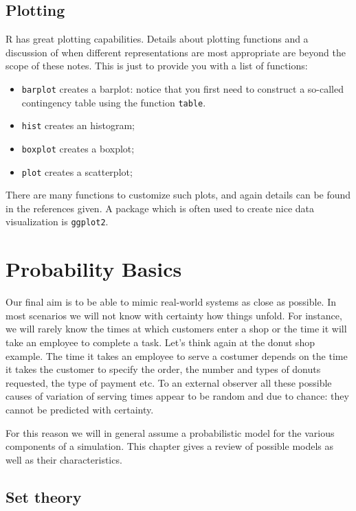 \documentclass[
]{book}
\theoremstyle{definition}
\theoremstyle{definition}
\theoremstyle{definition}
\theoremstyle{definition}
\theoremstyle{remark}
\begin{document}
\hypertarget{plotting}{%
\section{Plotting}\label{plotting}}

R has great plotting capabilities. Details about plotting functions and a discussion of when different representations are most appropriate are beyond the scope of these notes. This is just to provide you with a list of functions:

\begin{itemize}
\item
  \texttt{barplot} creates a barplot: notice that you first need to construct a so-called contingency table using the function \texttt{table}.
\item
  \texttt{hist} creates an histogram;
\item
  \texttt{boxplot} creates a boxplot;
\item
  \texttt{plot} creates a scatterplot;
\end{itemize}

There are many functions to customize such plots, and again details can be found in the references given. A package which is often used to create nice data visualization is \texttt{ggplot2}.

\hypertarget{probability-basics}{%
\chapter{Probability Basics}\label{probability-basics}}

Our final aim is to be able to mimic real-world systems as close as possible. In most scenarios we will not know with certainty how things unfold. For instance, we will rarely know the times at which customers enter a shop or the time it will take an employee to complete a task. Let's think again at the donut shop example. The time it takes an employee to serve a costumer depends on the time it takes the customer to specify the order, the number and types of donuts requested, the type of payment etc. To an external observer all these possible causes of variation of serving times appear to be random and due to chance: they cannot be predicted with certainty.

For this reason we will in general assume a probabilistic model for the various components of a simulation. This chapter gives a review of possible models as well as their characteristics.

\hypertarget{set-theory}{%
\section{Set theory}\label{set-theory}}
\end{document}
